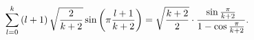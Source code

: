 \begin{equation}
  \sum_{l=0}^k
  \left( l+1 \right)
  \sqrt{{2 \over {k+2}}} \sin \left( \pi {{l+1} \over {k+2}} \right)
  = \sqrt{{{k+2} \over 2}} \cdot
    {{\sin {{\pi} \over {k+2}}} \over {1-\cos{{\pi} \over {k+2}}}}.
\end{equation}

